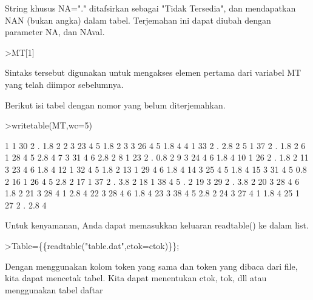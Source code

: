 \documentclass[a4paper,10pt]{article}
\begin{document}
\begin{eulernotebook}
\begin{eulercomment}
\begin{eulercomment}
\begin{eulercomment}
\begin{eulercomment}
\begin{eulercomment}
\begin{eulercomment}
\begin{eulercomment}
\begin{eulercomment}
\begin{eulercomment}
\begin{eulercomment}
\begin{eulercomment}
\begin{eulercomment}
\begin{eulercomment}
\begin{eulercomment}
\begin{eulercomment}
\begin{eulercomment}
\begin{eulercomment}
String khusus NA="." ditafsirkan sebagai "Tidak Tersedia", dan
mendapatkan NAN (bukan angka) dalam tabel. Terjemahan ini dapat diubah
dengan parameter NA, dan NAval.
\end{eulercomment}
\begin{eulerprompt}
>MT[1]
\end{eulerprompt}
\begin{euleroutput}
  [1,  1,  30,  2,  NAN,  1.8,  2]
\end{euleroutput}
\begin{eulercomment}
Sintaks tersebut digunakan untuk mengakses elemen pertama dari
variabel MT yang telah diimpor sebelumnya.

Berikut isi tabel dengan nomor yang belum diterjemahkan.
\end{eulercomment}
\begin{eulerprompt}
>writetable(MT,wc=5)
\end{eulerprompt}
\begin{euleroutput}
      1    1   30    2    .  1.8    2
      2    3   23    4    5  1.8    2
      3    3   26    4    5  1.8    4
      4    1   33    2    .  2.8    2
      5    1   37    2    .  1.8    2
      6    1   28    4    5  2.8    4
      7    3   31    4    6  2.8    2
      8    1   23    2    .  0.8    2
      9    3   24    4    6  1.8    4
     10    1   26    2    .  1.8    2
     11    3   23    4    6  1.8    4
     12    1   32    4    5  1.8    2
     13    1   29    4    6  1.8    4
     14    3   25    4    5  1.8    4
     15    3   31    4    5  0.8    2
     16    1   26    4    5  2.8    2
     17    1   37    2    .  3.8    2
     18    1   38    4    5    .    2
     19    3   29    2    .  3.8    2
     20    3   28    4    6  1.8    2
     21    3   28    4    1  2.8    4
     22    3   28    4    6  1.8    4
     23    3   38    4    5  2.8    2
     24    3   27    4    1  1.8    4
     25    1   27    2    .  2.8    4
\end{euleroutput}
\begin{eulercomment}
Untuk kenyamanan, Anda dapat memasukkan keluaran readtable() ke dalam
list.
\end{eulercomment}
\begin{eulerprompt}
>Table=\{\{readtable("table.dat",ctok=ctok)\}\};
\end{eulerprompt}
\begin{eulercomment}
Dengan menggunakan kolom token yang sama dan token yang dibaca dari
file, kita dapat mencetak tabel. Kita dapat menentukan ctok, tok, dll
atau menggunakan tabel daftar

\end{eulercomment}
\end{eulercomment}
\end{eulercomment}
\end{eulercomment}
\end{eulercomment}
\end{eulercomment}
\end{eulercomment}
\end{eulercomment}
\end{eulercomment}
\end{eulercomment}
\end{eulercomment}
\end{eulercomment}
\end{eulercomment}
\end{eulercomment}
\end{eulercomment}
\end{eulercomment}
\end{eulercomment}
\end{eulernotebook}
\end{document}

